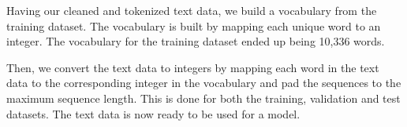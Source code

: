 Having our cleaned and tokenized text data, we build a vocabulary from the training dataset. The vocabulary is built by mapping each unique word to an integer. The vocabulary for the training dataset ended up being 10,336 words.

Then, we convert the text data to integers by mapping each word in the text data to the corresponding integer in the vocabulary and pad the sequences to the maximum sequence length. This is done for both the training, validation and test datasets. The text data is now ready to be used for a model.